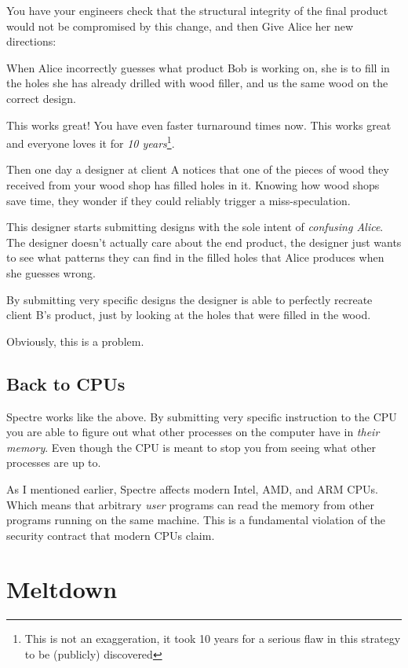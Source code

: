\documentclass{article}
\begin{document}
You have your engineers check that the structural integrity of the final product
would not be compromised by this change, and then Give Alice her new directions:

When Alice incorrectly guesses what product Bob is working on, she is to fill
in the holes she has already drilled with wood filler, and us the same wood on
the correct design.

This works great! You have even faster turnaround times now. This works great
and everyone loves it for \emph{10 years}\footnote{This is not an exaggeration,
it took 10 years for a serious flaw in this strategy to be (publicly) discovered}.

Then one day a designer at client A notices that one of the pieces of wood they
received from your wood shop has filled holes in it. Knowing how wood shops
save time, they wonder if they could reliably trigger a miss-speculation.

This designer starts submitting designs with the sole intent of \emph{confusing
Alice}. The designer doesn't actually care about the end product, the designer
just wants to see what patterns they can find in the filled holes that Alice
produces when she guesses wrong.

By submitting very specific designs the designer is able to perfectly recreate
client B's product, just by looking at the holes that were filled in the wood.

Obviously, this is a problem.


\subsection*{Back to CPUs}


Spectre works like the above. By submitting very specific instruction to the
CPU you are able to figure out what other processes on the computer have in
\emph{their memory}. Even though the CPU is meant to stop you from seeing what
other processes are up to.

As I mentioned earlier, Spectre affects modern Intel, AMD, and ARM CPUs. Which
means that arbitrary \emph{user} programs can read the memory from other
programs running on the same machine. This is a fundamental violation of the
security contract that modern CPUs claim.

\section{Meltdown}
\end{document}
